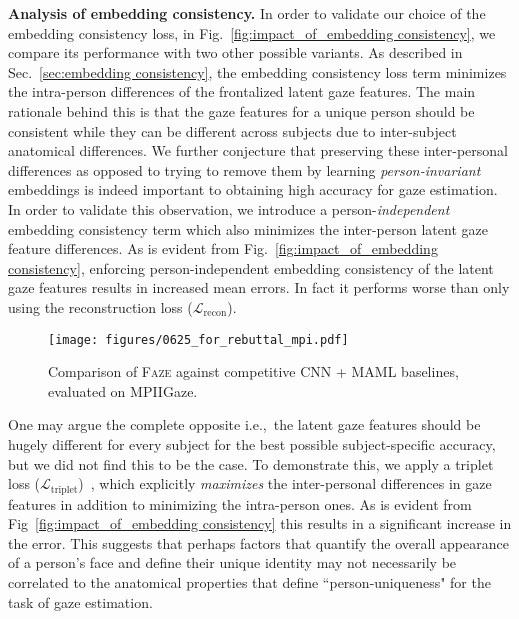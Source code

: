 \documentclass[10pt,twocolumn,letterpaper]{article}
\newcommand{\faze}[0]{\textsc{Faze}\xspace}
\newcommand{\Paragraph}[1]
{\vspace{1.5mm} \noindent \textbf{#1}}
\def\ie{i.e.,~}
\begin{document}
\Paragraph{Analysis of embedding consistency.} In order to validate our choice of the embedding consistency loss, in Fig.~\ref{fig:impact_of_embedding consistency}, we compare its performance with two other possible variants. As described in Sec.~\ref{sec:embedding consistency}, the embedding consistency loss term minimizes the intra-person differences of the frontalized latent gaze features. The main rationale behind this is that the gaze features for a unique person should be consistent while they can be different across subjects due to inter-subject anatomical differences. We further conjecture that preserving these inter-personal differences as opposed to trying to remove them by learning \emph{person-invariant} embeddings is indeed important to obtaining high accuracy for gaze estimation. In order to validate this observation, we introduce a person-\emph{independent} embedding consistency term which also minimizes the inter-person latent gaze feature differences. As is evident from Fig.~\ref{fig:impact_of_embedding consistency}, enforcing person-independent embedding consistency of the latent gaze features results in increased mean errors. In fact it performs worse than only using the reconstruction loss ($\mathcal{L}_{\mathrm{recon}}$). 

\begin{figure}
    \centering
    \texttt{[image: figures/0625\_for\_rebuttal\_mpi.pdf]}
    \vskip -1mm
    \caption{Comparison of \faze against competitive CNN + MAML baselines, evaluated on MPIIGaze.
    }
    \label{fig:cnn-maml}
    \vskip -3mm
\end{figure}

One may argue the complete opposite \ie the latent gaze features should be hugely different for every subject for the best possible subject-specific accuracy, but we did not find this to be the case. To demonstrate this, we apply a triplet loss ($\mathcal{L}_{\mathrm{triplet}}$)~\cite{Schroff2015CVPR}, which explicitly \emph{maximizes} the inter-personal differences in gaze features in addition to minimizing the intra-person ones. As is evident from Fig~\ref{fig:impact_of_embedding consistency} this results in a significant increase in the error. This suggests that perhaps factors that quantify the overall appearance of a person's face and define their unique identity may not necessarily be correlated to the anatomical properties that define ``person-uniqueness" for the task of gaze estimation. 
\end{document}
